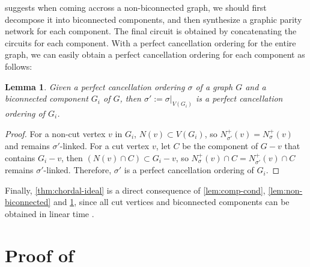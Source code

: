 \documentclass[a4paper,cleveref, autoref, 11pt, fleqn, thm-restate]{article}
\theoremstyle{plain}
\newtheorem{lemma}[theorem]{Lemma}
\begin{document}
 suggests when coming accross a non-biconnected graph, we should first decompose it into biconnected components, and then synthesize a graphic parity network for each component. The final circuit is obtained by concatenating the circuits for each component. With a perfect cancellation ordering for the entire graph, we can easily obtain a perfect cancellation ordering for each component as follows:
\begin{lemma}
  \label{lem:suborder}
  Given a perfect cancellation ordering $\sigma$ of a graph $G$ and a biconnected component $G_i$ of $G$, then $\sigma':=\sigma|_{V(G_i)}$ is a perfect cancellation ordering of $G_i$.
\end{lemma}
\begin{proof}
  For a non-cut vertex $v$ in $G_i$, $N(v)\subset V(G_i)$, so $N_{\sigma'}^{+}(v)=N_{\sigma}^{+}(v)$ and remains $\sigma'$-linked. For a cut vertex $v$, let $C$ be the component of $G-v$ that contains $G_i-v$, then $(N(v)\cap C)\subset G_i-v$, so $N_{\sigma}^{+}(v)\cap C=N_{\sigma'}^{+}(v)\cap C$ remains $\sigma'$-linked. Therefore, $\sigma'$ is a perfect cancellation ordering of $G_i$.
\end{proof}


Finally, \cref{thm:chordal-ideal} is a direct consequence of \cref{lem:comp-cond}, \cref{lem:non-biconnected} and \cref{lem:suborder}, since all cut vertices and biconnected components can be obtained in linear time \cite{hopcroftjohnAlgorithm447Efficient1973}.

\section{Proof of }\label{app:proof-cor:simpl}
\end{document}
